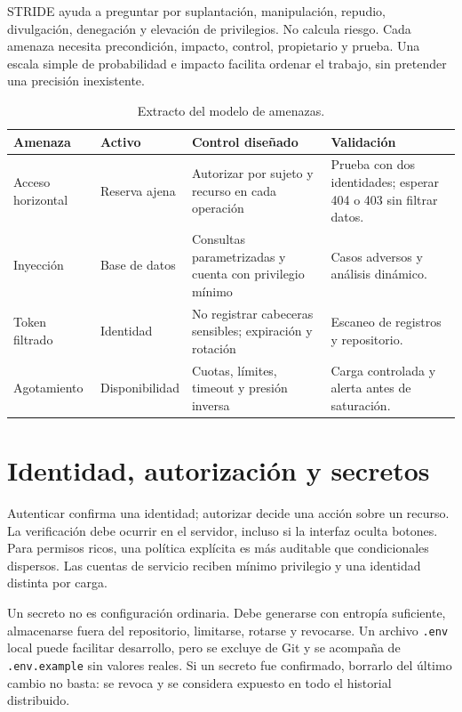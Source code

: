 STRIDE ayuda a preguntar por suplantación, manipulación, repudio, divulgación, denegación y elevación de privilegios. No calcula riesgo. Cada amenaza necesita precondición, impacto, control, propietario y prueba. Una escala simple de probabilidad e impacto facilita ordenar el trabajo, sin pretender una precisión inexistente.

\begin{table}[htbp]
\centering
\caption{Extracto del modelo de amenazas.}
\begin{tabularx}{\textwidth}{p{2.25cm}p{2.4cm}X X}
\toprule
\textbf{Amenaza} & \textbf{Activo} & \textbf{Control diseñado} & \textbf{Validación}\\
\midrule
Acceso horizontal & Reserva ajena & Autorizar por sujeto y recurso en cada operación & Prueba con dos identidades; esperar 404 o 403 sin filtrar datos.\\
Inyección & Base de datos & Consultas parametrizadas y cuenta con privilegio mínimo & Casos adversos y análisis dinámico.\\
Token filtrado & Identidad & No registrar cabeceras sensibles; expiración y rotación & Escaneo de registros y repositorio.\\
Agotamiento & Disponibilidad & Cuotas, límites, timeout y presión inversa & Carga controlada y alerta antes de saturación.\\
\bottomrule
\end{tabularx}
\end{table}

\section{Identidad, autorización y secretos}

Autenticar confirma una identidad; autorizar decide una acción sobre un recurso. La verificación debe ocurrir en el servidor, incluso si la interfaz oculta botones. Para permisos ricos, una política explícita es más auditable que condicionales dispersos. Las cuentas de servicio reciben mínimo privilegio y una identidad distinta por carga.

Un secreto no es configuración ordinaria. Debe generarse con entropía suficiente, almacenarse fuera del repositorio, limitarse, rotarse y revocarse. Un archivo \texttt{.env} local puede facilitar desarrollo, pero se excluye de Git y se acompaña de \texttt{.env.example} sin valores reales. Si un secreto fue confirmado, borrarlo del último cambio no basta: se revoca y se considera expuesto en todo el historial distribuido.

